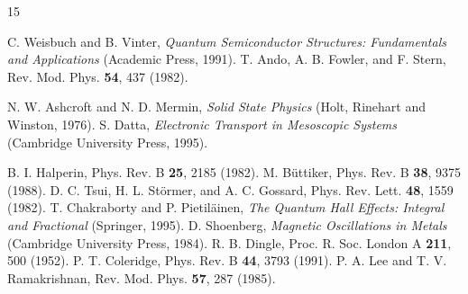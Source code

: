 \documentclass[
    aps,
    prb, 
    twocolumn, superscriptaddress,
    amsmath,
    amssymb,
    floatfix
]{revtex4-2}
\begin{document}

\begin{thebibliography}{15}


 C. Weisbuch and B. Vinter, \textit{Quantum Semiconductor Structures: Fundamentals and Applications} (Academic Press, 1991).
 T. Ando, A. B. Fowler, and F. Stern, Rev. Mod. Phys. \textbf{54}, 437 (1982).

 N. W. Ashcroft and N. D. Mermin, \textit{Solid State Physics} (Holt, Rinehart and Winston, 1976).
 S. Datta, \textit{Electronic Transport in Mesoscopic Systems} (Cambridge University Press, 1995).

 B. I. Halperin, Phys. Rev. B \textbf{25}, 2185 (1982).
 M. B\"uttiker, Phys. Rev. B \textbf{38}, 9375 (1988).
 D. C. Tsui, H. L. St\"ormer, and A. C. Gossard, Phys. Rev. Lett. \textbf{48}, 1559 (1982).
 T. Chakraborty and P. Pietil\"ainen, \textit{The Quantum Hall Effects: Integral and Fractional} (Springer, 1995).
 D. Shoenberg, \textit{Magnetic Oscillations in Metals} (Cambridge University Press, 1984).
 R. B. Dingle, Proc. R. Soc. London A \textbf{211}, 500 (1952).
 P. T. Coleridge, Phys. Rev. B \textbf{44}, 3793 (1991).
 P. A. Lee and T. V. Ramakrishnan, Rev. Mod. Phys. \textbf{57}, 287 (1985).

\end{thebibliography}
\end{document}
